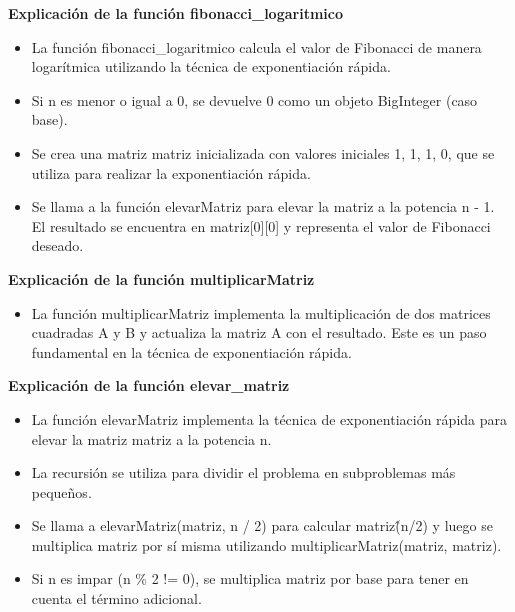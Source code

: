 \documentclass{article}
\begin{document}
            	

            \textbf{Explicación de la función fibonacci\_logaritmico}\par  
            \begin{itemize}
                \item {La función fibonacci\_logaritmico calcula el valor de Fibonacci de manera logarítmica utilizando la técnica de exponentiación rápida.}
                \item {Si n es menor o igual a 0, se devuelve 0 como un objeto BigInteger (caso base).}
                \item {Se crea una matriz matriz inicializada con valores iniciales {{1, 1}, {1, 0}}, que se utiliza para realizar la exponentiación rápida.}
                \item {Se llama a la función elevarMatriz para elevar la matriz a la potencia n - 1. El resultado se encuentra en matriz[0][0] y representa el valor de Fibonacci deseado.}
            \end{itemize}

            \textbf{Explicación de la función multiplicarMatriz}\par  
            \begin{itemize}
                \item {La función multiplicarMatriz implementa la multiplicación de dos matrices cuadradas A y B y actualiza la matriz A con el resultado. Este es un paso fundamental en la técnica de exponentiación rápida.}
            \end{itemize}

            \textbf{Explicación de la función elevar\_matriz}\par  
            \begin{itemize}
                \item {La función elevarMatriz implementa la técnica de exponentiación rápida para elevar la matriz matriz a la potencia n.}
                \item {La recursión se utiliza para dividir el problema en subproblemas más pequeños.}
                \item {Se llama a elevarMatriz(matriz, n \// 2) para calcular matriz\^(n\//2) y luego se multiplica matriz por sí misma utilizando multiplicarMatriz(matriz, matriz).}
                \item {Si n es impar (n \% 2 != 0), se multiplica matriz por base para tener en cuenta el término adicional.}
            \end{itemize}
        
\end{document}
